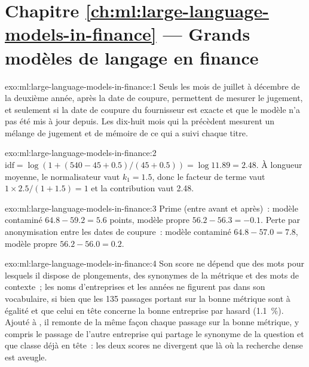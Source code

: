 \section*{Chapitre \ref{ch:ml:large-language-models-in-finance} --- Grands modèles de langage en finance}

\begin{solution}{exo:ml:large-language-models-in-finance:1}
Seuls les mois de juillet à décembre de la deuxième année, après la date de coupure, permettent de mesurer le jugement, et seulement si la date de coupure du fournisseur est
exacte et que le modèle n'a pas été mis à jour depuis. Les dix-huit mois qui la précèdent mesurent un mélange de jugement et de
mémoire de ce qui a suivi chaque titre.
\end{solution}

\begin{solution}{exo:ml:large-language-models-in-finance:2}
$\text{idf} = \log(1 + (540 - 45 + 0.5)/(45 + 0.5)) = \log 11.89 = 2.48$. À longueur moyenne, le normalisateur vaut $k_1 = 1.5$, donc
le facteur de terme vaut $1\times2.5/(1 + 1.5) = 1$ et la contribution vaut 2.48.
\end{solution}

\begin{solution}{exo:ml:large-language-models-in-finance:3}
Prime (entre avant et après)~: modèle contaminé $64.8 - 59.2 = 5.6$ points, modèle propre $56.2 - 56.3 = -0.1$. Perte par anonymisation
entre les dates de coupure~: modèle contaminé $64.8 - 57.0 = 7.8$, modèle propre $56.2 - 56.0 = 0.2$.
\end{solution}

\begin{solution}{exo:ml:large-language-models-in-finance:4}
Son score ne dépend que des mots pour lesquels il dispose de plongements, des synonymes de la métrique et des mots de contexte~; les noms d'entreprises et les années
ne figurent pas dans son vocabulaire, si bien que les 135 passages portant sur la bonne métrique sont à égalité et que celui en tête concerne la bonne entreprise par
hasard (1.1~\%). Ajouté à , il remonte de la même façon chaque passage sur la bonne métrique, y compris le passage de l'autre
entreprise qui partage le synonyme de la question et que  classe déjà en tête~: les deux scores ne divergent que là où la recherche dense est
aveugle.
\end{solution}

